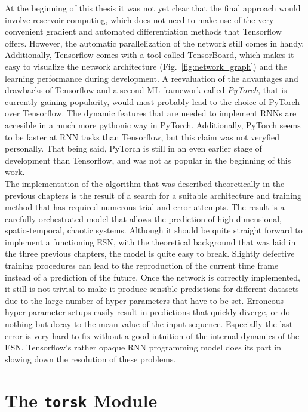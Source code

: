 At the beginning of this thesis it was not yet clear that the final approach
would involve reservoir computing, which does not need to make use of the very
convenient gradient and automated differentiation methods that Tensorflow
offers. However, the automatic parallelization of the network still comes in
handy. Additionally, Tensorflow comes with a tool called TensorBoard, which
makes it easy to visualize the network architecture
(Fig.~\ref{fig:network_graph}) and the learning performance during development.
A reevaluation of the advantages and drawbacks of Tensorflow and a second ML
framework called \emph{PyTorch}, that is currently gaining popularity, would
most probably lead to the choice of PyTorch over Tensorflow.  The dynamic
features that are needed to implement RNNs are accesible in a much more
pythonic way in PyTorch. Additionally, PyTorch seems to be faster at RNN tasks
than Tensorflow, but this claim was not veryfied personally. That being said,
PyTorch is still in an even earlier stage of development than Tensorflow, and
was not as popular in the beginning of this work.\\

The implementation of the algorithm that was described theoretically in the
previous chapters is the result of a search for a suitable architecture and
training method that has required numerous trial and error attempts.  The
result is a carefully orchestrated model that allows the prediction of
high-dimensional, spatio-temporal, chaotic systems. Although it should be quite
straight forward to implement a functioning ESN, with the theoretical
background that was laid in the three previous chapters, the model is quite
easy to break.  Slightly defective training procedures can lead to the
reproduction of the current time frame instead of a prediction of the future.
Once the network is correctly implemented, it still is not trivial to make it
produce sensible predictions for different datasets due to the large number of
hyper-parameters that have to be set.  Erroneous hyper-parameter setups easily
result in predictions that quickly diverge, or do nothing but decay to the mean
value of the input sequence.  Especially the last error is very hard to fix
without a good intuition of the internal dynamics of the ESN.  Tensorflow's
rather opaque RNN programming model does its part in slowing down the
resolution of these problems.



\section{The \texttt{torsk} Module}%
\label{sec:overview}


